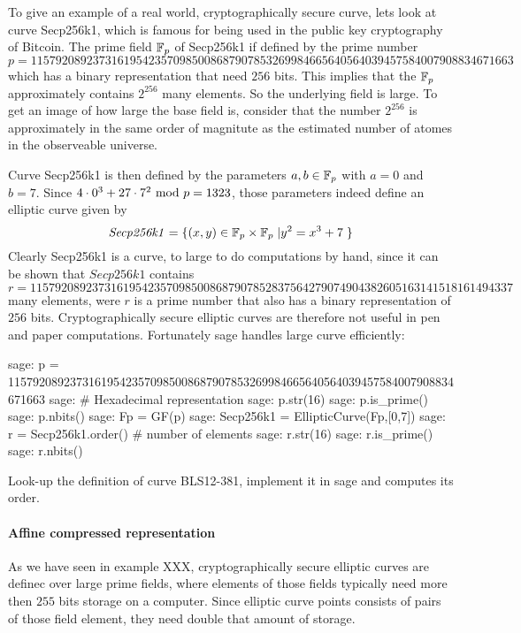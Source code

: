 \begin{example}To give an example of a real world, cryptographically secure curve, lets look at curve Secp256k1, which is famous for being used in the public key cryptography of Bitcoin. The prime field $\mathbb{F}_p$ of Secp256k1 if defined by the prime number
$$
p = \scriptstyle 115792089237316195423570985008687907853269984665640564039457584007908834671663
$$
which has a binary representation that need $256$ bits. This implies that the $\mathbb{F}_p$ approximately contains $2^{256}$ many elements. So the underlying field is large. To get an image of how large the base field is, consider that the number $2^{256}$ is approximately in the same order of magnitute as the estimated number of atomes in the observeable universe. 

Curve Secp256k1 is then defined by the parameters $a,b\in \mathbb{F}_p$ with $a=0$ and $b=7$. Since $4\cdot 0^3 + 27\cdot 7^2 \text{ mod } p=1323$, those parameters indeed define an elliptic curve given by
$$
\mathit{Secp256k1} = \{(x,y)\in \mathbb{F}_p\times \mathbb{F}_p\;| y^2 = x^3 +7\;\} 
$$
Clearly Secp256k1 is a curve, to large to do computations by hand, since it can be shown that $\mathit{Secp256k1}$ contains 
$$
r = \scriptstyle 11579208923731619542357098500868790785283756427907490438260516
3141518161494337
$$
many elements, were $r$ is a prime number that also has a binary representation of $256$ bits. Cryptographically secure elliptic curves are therefore not useful in pen and paper computations. Fortunately sage handles large curve efficiently:
\begin{sagecommandline}
sage: p = 115792089237316195423570985008687907853269984665640564039457584007908834671663
sage: # Hexadecimal representation
sage: p.str(16)
sage: p.is_prime()
sage: p.nbits()
sage: Fp = GF(p)
sage: Secp256k1 = EllipticCurve(Fp,[0,7])
sage: r = Secp256k1.order() # number of elements
sage: r.str(16)
sage: r.is_prime()
sage: r.nbits()
\end{sagecommandline}
\end{example}
\begin{exercise}
Look-up the definition of curve BLS12-381, implement it in sage and computes its order.
\end{exercise}
\paragraph{Affine compressed representation} As we have seen in example XXX, cryptographically secure elliptic curves are definec over large prime fields, where elements of those fields typically need more then $255$ bits storage on a computer. Since elliptic curve points consists of pairs of those field element, they need double that amount of storage.

